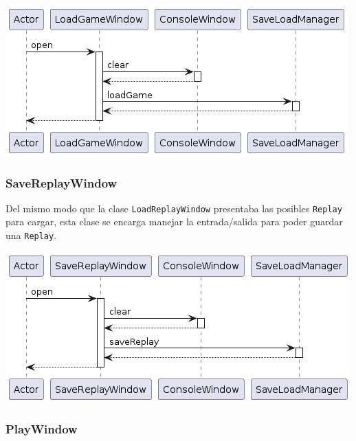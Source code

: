\documentclass[../DocumentoOficial.tex]{subfiles}
\begin{document}
\begin{center}
\includegraphics[scale=0.5]{LoadReplayWindow_final_seq}
\end{center}

\subsubsection{SaveReplayWindow}
Del mismo modo que la clase \texttt{LoadReplayWindow} presentaba las posibles \texttt{Replay} para cargar, esta clase se encarga manejar la entrada/salida para poder guardar una \texttt{Replay}.

\begin{center}
\includegraphics[scale=0.5]{SaveReplayWindow_final_seq}
\end{center}

\subsubsection{PlayWindow}
\end{document}
